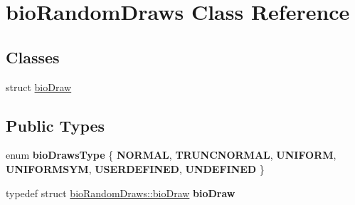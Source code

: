 \hypertarget{classbio_random_draws}{}\section{bio\+Random\+Draws Class Reference}
\label{classbio_random_draws}
\subsection*{Classes}
\begin{DoxyCompactItemize}
\item 
struct \hyperlink{structbio_random_draws_1_1bio_draw}{bio\+Draw}
\end{DoxyCompactItemize}
\subsection*{Public Types}
\begin{DoxyCompactItemize}
\item 
\mbox{\label{classbio_random_draws_a34f1f60d13315a6d4681a2e927d2a45b}} 
enum {\bfseries bio\+Draws\+Type} \{ \newline
{\bfseries N\+O\+R\+M\+AL}, 
{\bfseries T\+R\+U\+N\+C\+N\+O\+R\+M\+AL}, 
{\bfseries U\+N\+I\+F\+O\+RM}, 
{\bfseries U\+N\+I\+F\+O\+R\+M\+S\+YM}, 
\newline
{\bfseries U\+S\+E\+R\+D\+E\+F\+I\+N\+ED}, 
{\bfseries U\+N\+D\+E\+F\+I\+N\+ED}
 \}
\item 
\mbox{\label{classbio_random_draws_ad6b64c44a4f8e8672c556bb193d51cb5}} 
typedef struct \hyperlink{structbio_random_draws_1_1bio_draw}{bio\+Random\+Draws\+::bio\+Draw} {\bfseries bio\+Draw}
\end{DoxyCompactItemize}
